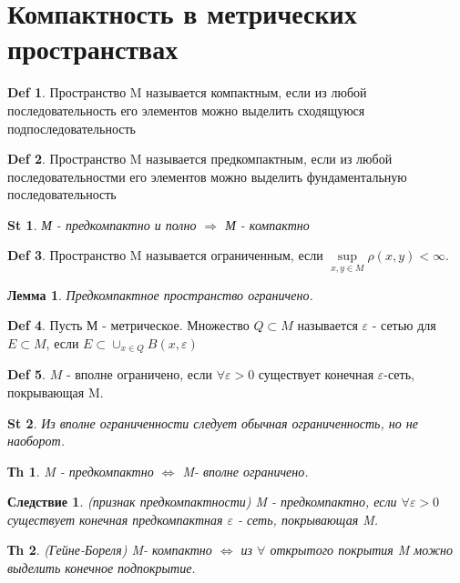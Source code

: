 \documentclass[14pt]{article}
\theoremstyle{plain}
\newtheorem{Thm}{Тh}
\newtheorem{Lem}{Лемма}
\newtheorem{St}{St}
\newtheorem{Sled}{Следствие}
\theoremstyle{definition}
\newtheorem{Def}{Def}
\begin{document}
		\section{Компактность в метрических пространствах}
			\begin{Def}
				Пространство M называется компактным, если из любой последовательность его элементов можно выделить сходящуюся подпоследовательность
			\end{Def}
			\begin{Def}
				Пространство M называется предкомпактным, если из любой последовательностми его элементов можно выделить фундаментальную последовательность
			\end{Def}
		 	\begin{St}
				М - предкомпактно и полно $\Rightarrow$ М - компактно	 		
		 	\end{St}
	 		\begin{Def}
	 			Пространство M называется ограниченным, если $\sup\limits_{x,y \in M} \rho(x,y) < \infty$. 	
	 		\end{Def}
 			\begin{Lem}
 				Предкомпактное пространство ограничено. 
 			\end{Lem}
 			\begin{Def}
 				Пусть М - метрическое. Множество $Q \subset M$ называется $\varepsilon$ - сетью для $E \subset M$, если $E \subset \cup_{x \in Q} B(x, \varepsilon)$			
 			\end{Def}
 			\begin{Def}
 				$M$ - вполне ограничено, если $\forall \varepsilon > 0$ существует конечная $\varepsilon$-сеть, покрывающая M. 
 			\end{Def}
 			\begin{St}
 				Из вполне ограниченности следует обычная ограниченность, но не наоборот. 
 			\end{St}
 			\begin{Thm}
 				M - предкомпактно $\Leftrightarrow$ M- вполне ограничено. 
 			\end{Thm}
 			\begin{Sled}
 				(признак предкомпактности) \newline
 				M - предкомпактно, если $\forall \varepsilon> 0$ существует конечная предкомпактная $\varepsilon$ - сеть, покрывающая M. 		
 			\end{Sled}
 			\begin{Thm}
 				(Гейне-Бореля) \newline
 				M- компактно $\Leftrightarrow$ из $\forall$ открытого покрытия M можно выделить конечное подпокрытие. 
 			\end{Thm}
\end{document}
